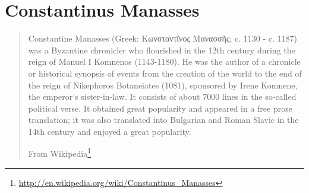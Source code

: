 \documentclass[12pt,letterpaper,twoside,final]{memoir}
\begin{document}
\section{Constantinus Manasses}
\blockquote[From Wikipedia\footnote{\url{http://en.wikipedia.org/wiki/Constantinus_Manasses}}]{Constantine Manasses (Greek: Κωνσταντῖνος Μανασσῆς; c. 1130 - c. 1187) was a Byzantine chronicler who flourished in the 12th century during the reign of Manuel I Komnenos (1143-1180). He was the author of a chronicle or historical synopsis of events from the creation of the world to the end of the reign of Nikephoros Botaneiates (1081), sponsored by Irene Komnene, the emperor's sister-in-law. It consists of about 7000 lines in the so-called political verse. It obtained great popularity and appeared in a free prose translation; it was also translated into Bulgarian and Roman Slavic in the 14th century and enjoyed a great popularity.}
\end{document}
